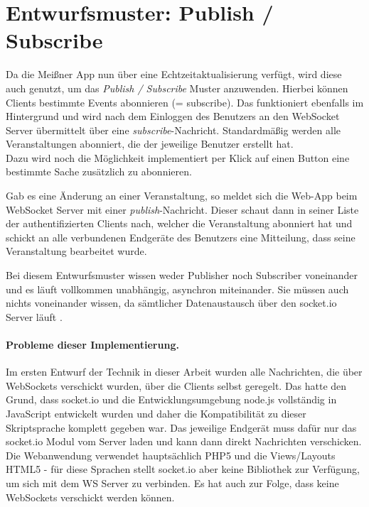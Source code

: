 \section{Entwurfsmuster: Publish / Subscribe}
Da die Meißner App nun über eine Echtzeitaktualisierung verfügt, wird diese auch genutzt, um das \emph{Publish / Subscribe} Muster anzuwenden. Hierbei können Clients bestimmte Events abonnieren (= subscribe). Das funktioniert ebenfalls im Hintergrund und wird nach dem Einloggen des Benutzers an den WebSocket Server übermittelt über eine \emph{subscribe}-Nachricht. Standardmäßig werden alle Veranstaltungen abonniert, die der jeweilige Benutzer erstellt hat.\\
Dazu wird noch die Möglichkeit implementiert per Klick auf einen Button eine bestimmte Sache zusätzlich zu abonnieren.\par

Gab es eine Änderung an einer Veranstaltung, so meldet sich die Web-App beim WebSocket Server mit einer \emph{publish}-Nachricht. Dieser schaut dann in seiner Liste der authentifizierten Clients nach, welcher die Veranstaltung abonniert hat und schickt an alle verbundenen Endgeräte des Benutzers eine Mitteilung, dass seine Veranstaltung bearbeitet wurde.\par

Bei diesem Entwurfsmuster wissen weder Publisher noch Subscriber voneinander und es läuft vollkommen unabhängig, asynchron miteinander. Sie müssen auch nichts voneinander wissen, da sämtlicher Datenaustausch über den socket.io Server läuft \cite{autobahn.js:pubsub}.

\paragraph{Probleme dieser Implementierung.}
Im ersten Entwurf der Technik in dieser Arbeit wurden alle Nachrichten, die über WebSockets verschickt wurden, über die Clients selbst geregelt. Das hatte den Grund, dass socket.io und die Entwicklungsumgebung node.js vollständig in JavaScript entwickelt wurden und daher die Kompatibilität zu dieser Skriptsprache komplett gegeben war. Das jeweilige Endgerät muss dafür nur das socket.io Modul vom Server laden und kann dann direkt Nachrichten verschicken.\\
Die Webanwendung verwendet hauptsächlich PHP5 und die Views/Layouts HTML5 - für diese Sprachen stellt socket.io aber keine Bibliothek zur Verfügung, um sich mit dem WS Server zu verbinden. Es hat auch zur Folge, dass keine WebSockets verschickt werden können.\par

